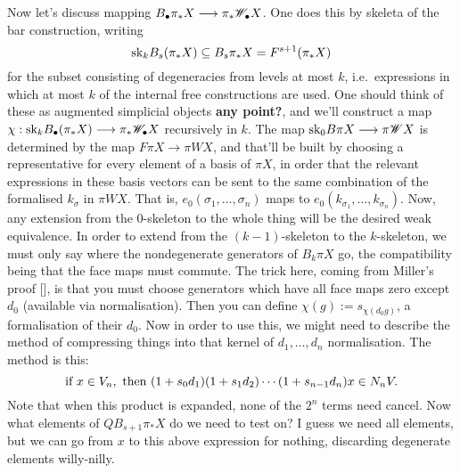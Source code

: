 \documentclass[10pt]{article}
\begin{document}
\begin{Koszul Actions}
Now let's discuss mapping $B_\bullet\pi_*X \longrightarrow \pi_*\mathscr{W}_\bullet X$. One does this by skeleta of the bar construction, writing
\[\textup{sk}_kB_s(\pi_*X)\subseteq B_s\pi_*X=F^{s+1}(\pi_*X)\]
for the subset consisting of degeneracies from levels at most $k$, i.e.\ expressions in which at most $k$ of the internal free constructions are used. One should think of these as augmented simplicial objects \textbf{any point?}, and we'll construct a map $\chi:\textup{sk}_kB_\bullet(\pi_*X)\longrightarrow \pi_*\mathscr{W}_\bullet X$ recursively in $k$. The map $\textup{sk}_0B\pi X\longrightarrow\pi\mathscr{W} X$ is determined by the map $F\pi X\to \pi WX$, and that'll be built by choosing a representative for every element of a basis of $\pi X$, in order that the relevant expressions in these basis vectors can be sent to the same combination of the formalised $k_\sigma$ in $\pi WX$. That is, $e_0(\sigma_1,\ldots,\sigma_n)$ maps to $e_0(k_{\sigma_1},\ldots,k_{\sigma_n})$. Now, any extension from the $0$-skeleton to the whole thing will be the desired weak equivalence. In order to extend from the $(k-1)$-skeleton to the $k$-skeleton, we must only say where the nondegenerate generators of $B_k\pi X$ go, the compatibility being that the face maps must commute. The trick here, coming from Miller's proof [], is that you must choose generators which have all face maps zero except $d_0$ (available via normalisation). Then you can define $\chi(g):=s_{\chi(d_0g)}$, a formalisation of their $d_0$. Now in order to use this, we might need to describe the method of compressing things into that kernel of $d_1,\ldots,d_n$ normalisation. The method is this:
\[\textup{if }x\in V_n,\textup{ then }(1+s_0d_1)(1+s_1d_2)\cdots (1+s_{n-1}d_n)x\in N_nV.\]
Note that when this product is expanded, none of the $2^n$ terms need cancel. Now what elements of $QB_{s+1}\pi_*X$ do we need to test on? I guess we need all elements, but we can go from $x$ to this above expression for nothing, discarding degenerate elements willy-nilly.


\end{Koszul Actions}
\end{document}
